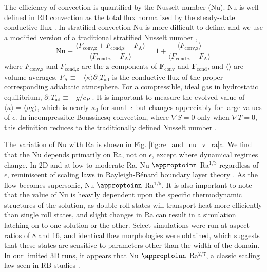 \documentclass[aps, prl, twocolumn, nofootinbib, groupedaddress, amsfonts, amssymb, amsmath]{revtex4-1}
\newcommand{\grad}{\ensuremath{\nabla}}
\newcommand{\RB}{Rayleigh-B\'{e}nard }
\newcommand{\approptoinn}[2]{\mathrel{\vcenter{
	\offinterlineskip\halign{\hfil$##$\cr
	#1\propto\cr\noalign{\kern2pt}#1\sim\cr\noalign{\kern-2pt}}}}}
\newcommand{\appropto}{\mathpalette\approptoinn\relax}
\begin{document}
The efficiency of convection is quantified by the Nusselt number (Nu).  
Nu is well-defined in RB convection
as the total flux normalized by the steady-state conductive flux 
\cite{johnston&doering2009, otero&all2002}.
In stratified convection Nu is more difficult to define, and we use
a modified version of a traditional stratified Nusselt number 
\cite{graham1975,hurlburt&all1984},
\begin{equation}
\text{Nu} \equiv \frac{\langle F_{\text{conv,z}} + F_{\text{cond,z}} - F_{\text{A}}\rangle}
{\langle F_{\text{cond,z}} - F_{\text{A}}\rangle} 
= 1 + \frac{\langle F_{\text{conv,z}}\rangle}{\langle F_{\text{cond,z}} - F_{\text{A}} \rangle}
\label{eqn:nusselt}
\end{equation}
where $F_{\text{conv,z}}$ and $F_{\text{cond,z}}$ are the 
z-components of $\bm{F}_{\text{conv}}$ and $\bm{F}_{\text{cond}}$,
and $\langle \rangle$ are volume averages.  
$F_{\text{A}} \equiv -\langle\kappa\rangle \partial_z T_{\text{ad}}$ 
is the conductive flux of the proper corresponding adiabatic atmosphere.
For a compressible, ideal gas in hydrostatic equilibrium,
$\partial_z T_{\text{ad}} \equiv - g / c_{P}$ \cite{spiegel&veronis1960}.  
It is important to measure the evolved value of
$\langle \kappa \rangle = \langle \rho\chi \rangle$, which is nearly
$\kappa_0$ for small $\epsilon$ but changes appreciably for large
values of $\epsilon$.
In incompressible Boussinesq convection, where $\grad S = 0$ only when 
$\grad T = 0$, this definition reduces to the traditionally defined
Nusselt number \cite{otero&all2002, johnston&doering2009}.

The variation of Nu with Ra is shown in 
Fig. \ref{fig:re_and_nu_v_ra}a.  We find that the Nu depends primarily
on Ra, not on $\epsilon$, except where dynamical regimes change.
In 2D and at low to moderate Ra, 
Nu $\appropto$ Ra$^{1/3}$ regardless of $\epsilon$,
reminiscent of scaling laws in \RB boundary layer theory 
\cite{grossman&lohse2000, ahlers&all2009, king&all2012}.
As the flow becomes supersonic,  Nu $\appropto$ Ra$^{1/5}$.
It is also important to note that
the value of Nu is heavily dependent upon the specific thermodynamic
structures of the solution, as double roll states will transport
heat more efficiently than single roll states, and slight changes in
Ra can result in a simulation latching on to one solution or the other. 
Select simulations were run at aspect ratios of 8 and 16, and identical flow
morphologies were obtained, which suggests that these states are sensitive to
parameters other than the width of the domain.
In our limited 3D runs, it appears that Nu $\appropto$ Ra$^{2/7}$, a classic scaling law
seen in RB studies \cite{johnston&doering2009}.
\end{document}
